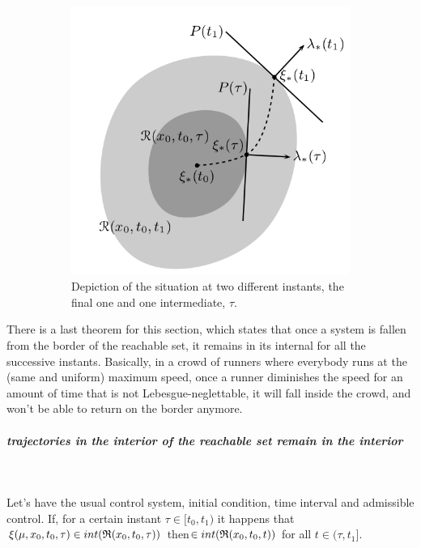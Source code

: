 \begin{figure}[h]
\begin{subfigure}[b]{0.25\linewidth}
	\end{subfigure}	
	\begin{subfigure}[b]{0.25\linewidth}
		\includegraphics[width=\linewidth]{imgs/5-3-R.png}
		\caption{Depiction of the situation at two different instants, the final one and one intermediate, $\tau$.}
	\end{subfigure}	
	\caption{\mbox{}}
	\label{fig-5.3}
\end{figure}

There is a last theorem for this section, which states that once a system is fallen from the border of the reachable set, it remains in its internal for all the successive instants. Basically, in a crowd of runners where everybody runs at the (same and uniform) maximum speed, once a runner diminishes the speed for an amount of time that is not Lebesgue-neglettable, it will fall inside the crowd, and won't be able to return on the border anymore. 

\subparagraph[5.17]{trajectories in the interior of the reachable set remain in the interior}\mbox{}\\
\begin{teo}
	Let's have the usual control system, initial condition, time interval and admissible control. If, for a certain instant $\tau\in[t_0,t_1)$ it happens that $\xi(\mu,x_0,t_0,\tau)\in int(\mathfrak{R}(x_0,t_0,\tau))$ then$\in int(\mathfrak{R}(x_0,t_0,t))$ for all $t\in(\tau,t_1]$.
	\label{5-17}
\end{teo}

